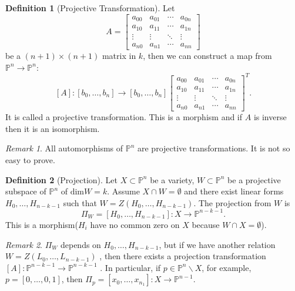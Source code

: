 \documentclass{amsart}
\theoremstyle{plain}
\theoremstyle{definition}
\newtheorem{definition}{Definition}
\theoremstyle{remark}
\newtheorem*{remark}{Remark}
\numberwithin{equation}{section}
\begin{document}
\begin{definition}[Projective Transformation]
	Let \begin{equation}
	A=\left[\begin{matrix}
	a_{00} & a_{01} & \cdots & a_{0n}\\
	a_{10} & a_{11} & \cdots & a_{1n}\\
	\vdots & \vdots & \ddots & \vdots\\
	a_{n0} & a_{n1} & \cdots & a_{nn}
	\end{matrix}\right]
	\end{equation}
	be a $ (n+1)\times (n+1) $ matrix  in $ k $, then we can construct a map from $ \mathbb{P}^n  \to  \mathbb{P}^n $:
	$$
	[A]:	[b_0,\dots,b_n]\to [b_0,\dots,b_n]\left[\begin{matrix}
		a_{00} & a_{01} & \cdots & a_{0n}\\
		a_{10} & a_{11} & \cdots & a_{1n}\\
		\vdots & \vdots & \ddots & \vdots\\
		a_{n0} & a_{n1} & \cdots & a_{nn}
		\end{matrix}\right]^{T}.
	$$
	It is called a projective transformation. This is a morphism and if $ A $ is inverse then it is an isomorphism.
\end{definition}
\begin{remark}
	All automorphisms of $ \mathbb{P}^n $  are projective transformations. It is not so easy to prove.
\end{remark}
\begin{definition}[Projection]
	Let $ X\subset\mathbb{P}^n  $ be a variety, $ W\subset \mathbb{P}^n $ be a projective subspace of $ \mathbb{P}^n $ of $ \text{dim}W=k $. Assume $ X\cap W= \emptyset $ and there exist linear forms $ H_0,\dots,H_{n-k-1} $ such that $ W=Z(H_0,\dots,H_{n-k-1}) $. The projection from $ W $ is
	$$
		\Pi_W=[H_0,\dots,H_{n-k-1}]:X\to \mathbb{P}^{n-k-1}.
	$$
	This is a morphism($ H_i $ have no common zero on $ X $ because $ W\cap X=\emptyset $).
 \end{definition}
 \begin{remark}
 	$ \Pi_W $ depends on $ H_0,\dots,H_{n-k-1} $, but if we have another relation $ W=Z(L_0,\dots,L_{n-k-1}) $ , then there exists a projection transformation $ [A]:\mathbb{P}^{n-k-1}\to \mathbb{P}^{n-k-1} $ . In particular, if $ p\in \mathbb{P}^n\backslash X $, for example, $ p=[0,\dots,0,1] $, then $ \Pi_p=[x_0,\dots,x_{n_1}] :X\to \mathbb{P}^{n-1}$.
 \end{remark}
\end{document}
